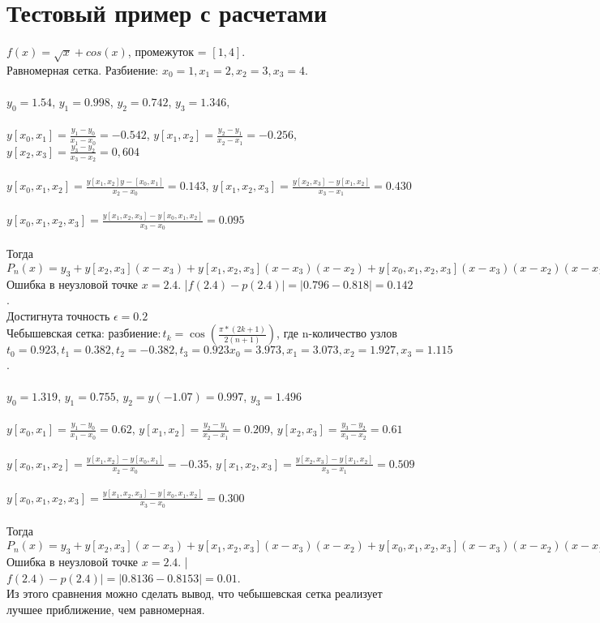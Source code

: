 \documentclass[12pt]{article}
\begin{document}
\section{Тестовый пример с расчетами}
$f(x)=\sqrt{x} + cos(x)$, промежуток = $[1,4]$.\\
Равномерная сетка. Разбиение: $x_0=1,x_1=2,x_2=3,x_3=4$.\\
\\
$y_0=1.54$, $y_1=0.998$, $y_2=0.742$, $y_3=1.346,$\\
\\
$y[x_0,x_1]=\frac{y_1-y_0}{x_1-x_0}=-0.542$, $y[x_1,x_2]=\frac{y_2-y_1}{x_2-x_1}=-0.256$, $y[x_2,x_3]=\frac{y_3-y_2}{x_3-x_2}=0,604$\\
\\
$y[x_0,x_1,x_2]=\frac{y[x_1,x_2]y-[x_0,x_1]}{x_2-x_0}=0.143$, $y[x_1,x_2,x_3]=\frac{y[x_2,x_3]-y[x_1,x_2]}{x_3-x_1}=0.430$ \\
\\
$y[x_0,x_1,x_2,x_3]=\frac{y[x_1,x_2,x_3]-y[x_0,x_1,x_2]}{x_3-x_0}=0.095$\\
\\
Тогда $P_n(x)=y_3+y[x_2,x_3](x-x_3)+y[x_1,x_2,x_3](x-x_3)(x-x_2)+y[x_0,x_1,x_2,x_3](x-x_3)(x-x_2)(x-x_1) = 1.346+0.604(x-4)+0.43(x-4)(x-3)+0.095(x-4)(x-3)(x-2)x= 0.095x^3+ 1.291 x^2 + 6.126 x + 0.464$\\
Ошибка в неузловой точке $x=2.4$. |$f(2.4)-p(2.4)|=|0.796-0.818|=0.142$.\\
Достигнута точность $\epsilon = 0.2$\\
Чебышевская сетка: $разбиение: t_k=\cos(\frac{\pi*(2k+1)}{2(n+1)})$, где n-количество узлов $ t_0=0.923, t_1=0.382, t_2=-0.382,t_3=0.923 x_0= 3.973, x_1=3.073, x_2=1.927, x_3= 1.115$.\\
\\
$y_0= 1.319$, $y_1=0.755$, $y_2=y(-1.07)=0.997$, $y_3=1.496$\\
\\
$y[x_0,x_1]=\frac{y_1-y_0}{x_1-x_0}=0.62$, $y[x_1,x_2]=\frac{y_2-y_1}{x_2-x_1}=0.209$, $y[x_2,x_3]=\frac{y_3-y_2}{x_3-x_2}=0.61$\\
\\
$y[x_0,x_1,x_2]=\frac{y[x_1,x_2]-y[x_0,x_1]}{x_2-x_0}=-0.35$, $y[x_1,x_2,x_3]=\frac{y[x_2,x_3]-y[x_1,x_2]}{x_3-x_1}=0.509$ \\
\\
$y[x_0,x_1,x_2,x_3]=\frac{y[x_1,x_2,x_3]-y[x_0,x_1,x_2]}{x_3-x_0}=0.300$\\
\\
Тогда $P_n(x)=y_3+y[x_2,x_3](x-x_3)+y[x_1,x_2,x_3](x-x_3)(x-x_2)+y[x_0,x_1,x_2,x_3](x-x_3)(x-x_2)(x-x_1) = 1.319+0.61(x-1.115)+0.509(x-1.115)(x-1.927) + 0.300(x- 1.115)(x - 1.927)(x - 3.073)=0.3x^3+0.461x^2+3.41x+4.213$\\
Ошибка в неузловой точке $x=2.4$. |$f(2.4)-p(2.4)|=|0.8136-0.8153|=0.01$.\\
Из этого сравнения можно сделать вывод, что чебышевская сетка реализует лучшее приближение, чем равномерная.
\end{document}
